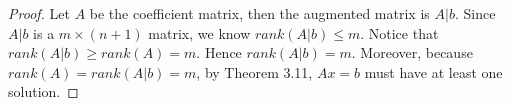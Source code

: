\begin{Exercise}
\begin{proof}
Let $A$ be the coefficient matrix, then the augmented matrix is $A|b$. Since $A|b$ is a $m\times (n+1)$ matrix, we know $rank(A|b) \leq m$. Notice that $rank(A|b) \geq rank(A) = m$. Hence $rank(A|b) = m$. Moreover, because $rank(A) = rank(A|b) = m$, by Theorem 3.11, $Ax = b$ must have at least one solution.
\end{proof}
\end{Exercise}